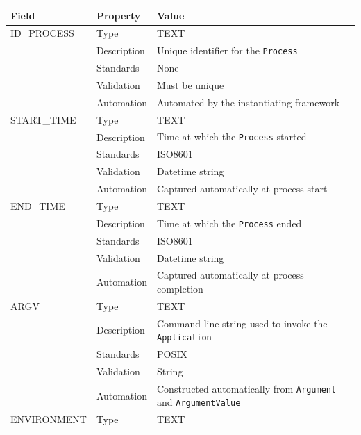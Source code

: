 \documentclass[
]{article}
\newcounter{none} %
\begin{document}
{\def\LTcaptype{none} %
\begin{longtable}[]{@{}
  >{\raggedright\arraybackslash}p{}
  >{\raggedright\arraybackslash}p{}
  >{\raggedright\arraybackslash}p{}@{}}
\toprule\noalign{}
\begin{minipage}[b]{\linewidth}\raggedright
Field
\end{minipage} & \begin{minipage}[b]{\linewidth}\raggedright
Property
\end{minipage} & \begin{minipage}[b]{\linewidth}\raggedright
Value
\end{minipage} \\
\midrule\noalign{}
\endhead
\bottomrule\noalign{}
\endlastfoot
ID\_PROCESS & Type & TEXT \\
& Description & Unique identifier for the \texttt{Process} \\
& Standards & None \\
& Validation & Must be unique \\
& Automation & Automated by the instantiating framework \\
START\_TIME & Type & TEXT \\
& Description & Time at which the \texttt{Process} started \\
& Standards & ISO8601 \\
& Validation & Datetime string \\
& Automation & Captured automatically at process start \\
END\_TIME & Type & TEXT \\
& Description & Time at which the \texttt{Process} ended \\
& Standards & ISO8601 \\
& Validation & Datetime string \\
& Automation & Captured automatically at process completion \\
ARGV & Type & TEXT \\
& Description & Command-line string used to invoke the
\texttt{Application} \\
& Standards & POSIX \\
& Validation & String \\
& Automation & Constructed automatically from \texttt{Argument} and
\texttt{ArgumentValue} \\
ENVIRONMENT & Type & TEXT \\

\end{longtable}}
\end{document}
